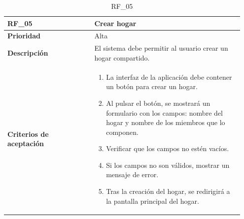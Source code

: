 \begin{table}[htb!]
    \begin{tabular}{|p{0.35\linewidth}|p{0.6\linewidth}|}
        \hline
        \rowcolor[HTML]{C0C0C0}  
        \textbf{RF\_05} & \textbf{Crear hogar} \\
        \hline
        \textbf{Prioridad} & Alta \\
        \hline
        \textbf{Descripción} & El sistema debe permitir al usuario crear un hogar compartido.  \\
        \hline
        \vspace{0.5mm}
        \textbf{Criterios de aceptación} & 
        \begin{minipage}[t]{0.9\linewidth}
            \begin{enumerate}
                \item La interfaz de la aplicación debe contener un botón para crear un hogar.
                \item Al pulsar el botón, se mostrará un formulario con los campos: nombre del hogar y nombre de los miembros que lo componen.
                \item Verificar que los campos no estén vacíos.
                \item Si los campos no son válidos, mostrar un mensaje de error.
                \item Tras la creación del hogar, se redirigirá a la pantalla principal del hogar.
            \end{enumerate}
            \vspace{2mm}
        \end{minipage} \\
        \hline
    \end{tabular}
    \caption{RF\_05}

\end{table}

